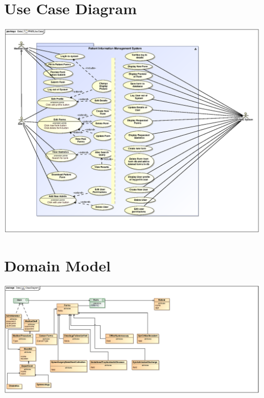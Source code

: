 \documentclass[a4paper,12pt,titlepage]{article}
\begin{document}


\tableofcontents
\newpage


\section{Use Case Diagram}
\includegraphics[width=\linewidth]{./Graphics/PIMSUseCase}
\pagebreak


\section{Domain Model}
\includegraphics[width=\linewidth]{./Graphics/ClassDiagramRefined}
\pagebreak












\end{document}
